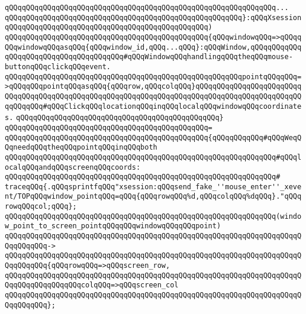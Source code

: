 \verb|qQQqqQQqqQQqqQQqqQQqqQQqqQQqqQQqqQQqqQQqqQQqqQQqqQQqqQQqqQQqqQQq...|\newline
\verb|qQQqqQQqqQQqqQQqqQQqqQQqqQQqqQQqqQQqqQQqqQQqqQQqqQQqqQQq}:qQQqXsession|\newline
\verb|qQQqqQQqqQQqqQQqqQQqqQQqqQQqqQQqqQQqqQQqqQQqqQQq)|\newline
\verb|qQQqqQQqqQQqqQQqqQQqqQQqqQQqqQQqqQQqqQQqqQQqqQQq{qQQqwindowqQQq=>qQQqqQQqwindowqQQqasqQQq{qQQqwindow_id,qQQq...qQQq}:qQQqWindow,qQQqqQQqqQQqqQQqqQQqqQQqqQQqqQQqqQQqqQQq#qQQqWindowqQQqhandlingqQQqtheqQQqmouse-buttonqQQqclickqQQqevent.|\newline
\verb|qQQqqQQqqQQqqQQqqQQqqQQqqQQqqQQqqQQqqQQqqQQqqQQqqQQqqQQqpointqQQqqQQq=>qQQqqQQqpointqQQqasqQQq{qQQqrow,qQQqcolqQQq}qQQqqQQqqQQqqQQqqQQqqQQqqQQqqQQqqQQqqQQqqQQqqQQqqQQqqQQqqQQqqQQqqQQqqQQqqQQqqQQqqQQqqQQqqQQqqQQqqQQqqQQq#qQQqClickqQQqlocationqQQqinqQQqlocalqQQqwindowqQQqcoordinates.|\newline
\verb|qQQqqQQqqQQqqQQqqQQqqQQqqQQqqQQqqQQqqQQqqQQqqQQq}|\newline
\verb|qQQqqQQqqQQqqQQqqQQqqQQqqQQqqQQqqQQqqQQqqQQqqQQq=|\newline
\verb|qQQqqQQqqQQqqQQqqQQqqQQqqQQqqQQqqQQqqQQqqQQqqQQq{qQQqqQQqqQQq#qQQqWeqQQqneedqQQqtheqQQqpointqQQqinqQQqboth|\newline
\verb|qQQqqQQqqQQqqQQqqQQqqQQqqQQqqQQqqQQqqQQqqQQqqQQqqQQqqQQqqQQqqQQq#qQQqlocalqQQqandqQQqscreenqQQqcoords:|\newline
\verb|qQQqqQQqqQQqqQQqqQQqqQQqqQQqqQQqqQQqqQQqqQQqqQQqqQQqqQQqqQQqqQQq#|\newline
\verb|traceqQQq{.qQQqsprintfqQQq"xsession:qQQqsend_fake_''mouse_enter''_xevent/TOPqQQqwindow_pointqQQq=qQQq{qQQqrowqQQq%d,qQQqcolqQQq%dqQQq}."qQQqrowqQQqcol;qQQq};|\newline
\verb|qQQqqQQqqQQqqQQqqQQqqQQqqQQqqQQqqQQqqQQqqQQqqQQqqQQqqQQqqQQqqQQq(window_point_to_screen_pointqQQqqQQqwindowqQQqqQQqpoint)|\newline
\verb|qQQqqQQqqQQqqQQqqQQqqQQqqQQqqQQqqQQqqQQqqQQqqQQqqQQqqQQqqQQqqQQqqQQqqQQqqQQqqQQq->|\newline
\verb|qQQqqQQqqQQqqQQqqQQqqQQqqQQqqQQqqQQqqQQqqQQqqQQqqQQqqQQqqQQqqQQqqQQqqQQqqQQqqQQq{qQQqrowqQQq=>qQQqscreen_row,|\newline
\verb|qQQqqQQqqQQqqQQqqQQqqQQqqQQqqQQqqQQqqQQqqQQqqQQqqQQqqQQqqQQqqQQqqQQqqQQqqQQqqQQqqQQqqQQqcolqQQq=>qQQqscreen_col|\newline
\verb|qQQqqQQqqQQqqQQqqQQqqQQqqQQqqQQqqQQqqQQqqQQqqQQqqQQqqQQqqQQqqQQqqQQqqQQqqQQqqQQq};|\newline
